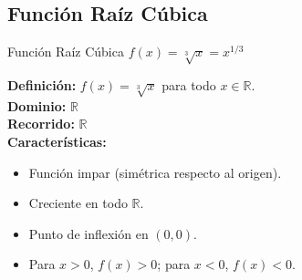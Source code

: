 \documentclass[12pt,a4paper]{article}
\begin{document}
\subsection{Función Raíz Cúbica}
\begin{funcbox}{Función Raíz Cúbica $f(x)=\sqrt[3]{x}=x^{1/3}$}
\begin{minipage}[t]{0.55\textwidth}
    \textbf{Definición:} $f(x)=\sqrt[3]{x}$ para todo $x\in\mathbb{R}$.\\
    \textbf{Dominio:} $\mathbb{R}$\\
    \textbf{Recorrido:} $\mathbb{R}$\\
    \textbf{Características:}
    \begin{itemize}
        \item Función impar (simétrica respecto al origen).
        \item Creciente en todo $\mathbb{R}$.
        \item Punto de inflexión en $(0,0)$.
        \item Para $x>0$, $f(x)>0$; para $x<0$, $f(x)<0$.
    \end{itemize}
\end{minipage}\hfill
\begin{minipage}[t]{0.4\textwidth}
    \centering
\end{minipage}
\end{funcbox}

\end{document}
